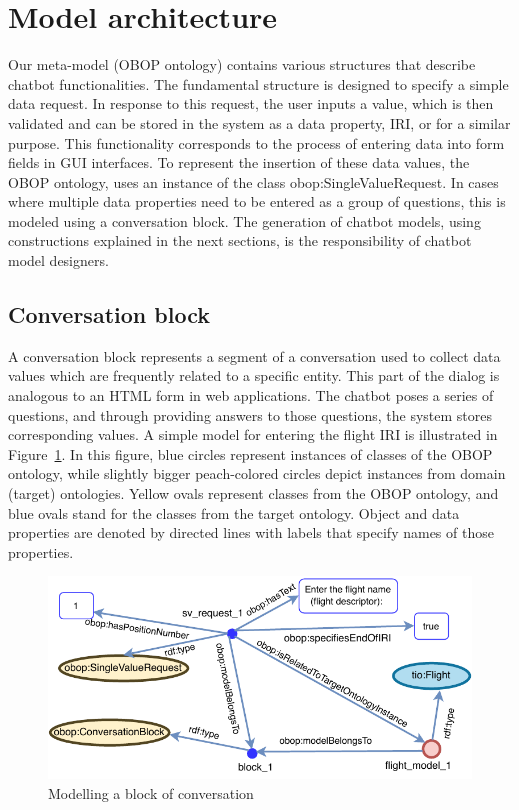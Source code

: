 \documentclass[runningheads]{llncs}
\begin{document}
\section{Model architecture}
Our meta-model (OBOP ontology) contains various structures that describe chatbot functionalities. The fundamental structure is designed to specify a simple data request. In response to this request, the user inputs a value, which is then validated and can be stored in the system as a data property, IRI, or for a similar purpose. This functionality corresponds to the process of entering data into form fields in GUI interfaces. To represent the insertion of these data values, the OBOP ontology, uses an instance of the class obop:SingleValueRequest. In cases where multiple data properties need to be entered as a group of questions, this is modeled using a conversation block. The generation of chatbot models, using constructions explained in the next sections, is the responsibility of chatbot model designers.  

\subsection{Conversation block}
A conversation block represents a segment of a conversation used to collect data values which are frequently related to a specific entity. This part of the dialog is analogous to an HTML form in web applications. The chatbot poses a series of questions, and through providing answers to those questions, the system stores corresponding values. A simple model for entering the flight IRI is illustrated in Figure~\ref{fig:conv_block}. In this figure, blue circles represent instances of classes of the OBOP ontology, while slightly bigger peach-colored circles depict instances from domain (target) ontologies. Yellow ovals represent classes from the OBOP ontology, and blue ovals stand for the classes from the target ontology. Object and data properties are denoted by directed lines with labels that specify names of those properties.     

\begin{figure}[H]
  \centering
  \includegraphics[width=\linewidth]{img/conversation_block}
  \caption{Modelling a block of conversation}
  \label{fig:conv_block}
\end{figure}
\end{document}
